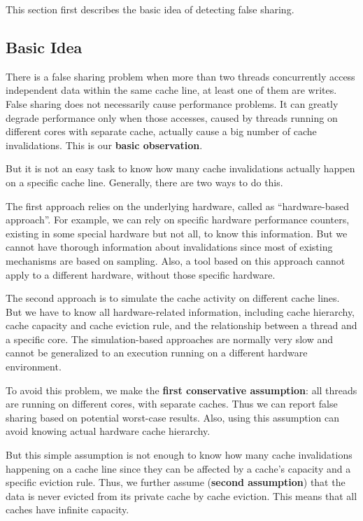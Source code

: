 \label{sec:detectfalseshare}

This section first describes the basic idea of detecting false sharing. 

\subsection{Basic Idea}
\label{sec:detectionidea}
There is a false sharing problem when more than two threads concurrently access independent data within the same cache line, at least one of them are writes. False sharing does not necessarily cause performance problems. It can greatly degrade performance only when those accesses, caused by threads running on different cores with separate cache, actually cause a big number of cache invalidations. This is our \textbf{basic observation}. 

But it is not an easy task to know how many cache invalidations actually happen on a specific cache line. Generally, there are two ways to do this. 

The first approach relies on the underlying hardware, called as ``hardware-based approach''. For example, we can rely on specific hardware performance counters, existing in some special hardware but not all, to know this information. But we cannot have thorough information about invalidations since most of existing mechanisms are based on sampling. Also, a tool based on this approach cannot apply to a different hardware, without those specific hardware. 

The second approach is to simulate the cache activity on different cache lines. But we have to know all hardware-related information, including cache hierarchy, cache capacity and cache eviction rule, and the relationship between a thread and a specific core. The simulation-based approaches are normally very slow and cannot be generalized to an execution running on a different hardware environment. 

To avoid this problem, we make the \textbf{ first conservative assumption}: all threads are running on different cores, with separate caches. Thus we can report false sharing based on  potential worst-case results. Also, using this assumption can avoid knowing actual hardware cache hierarchy. 

But this simple assumption is not enough to know how many cache invalidations happening on a cache line since they can be affected by a cache's capacity and a specific eviction rule. Thus, we further assume (\textbf{second assumption}) that the data is never evicted from its private cache by cache eviction. This means that all caches have infinite capacity. 

